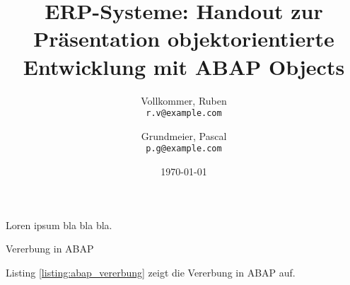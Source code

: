 \documentclass[12pt,a4paper]{scrartcl}
\begin{document}
\title{ERP-Systeme: Handout zur Präsentation objektorientierte Entwicklung mit ABAP Objects}

\author{
  Vollkommer, Ruben\\
  \texttt{r.v@example.com}
  \and
  Grundmeier, Pascal\\
  \texttt{p.g@example.com}
}


\date{\today}
\maketitle

\newpage
\tableofcontents

\renewcommand\listoflistingscaption{Liste des enthaltenen Quellcodes}
\listoflistings

\newpage






Loren ipsum bla bla bla.
\begin{listing}[ht]{}
  \caption{Vererbung in ABAP}
  \label{listing:abap_vererbung}
\end{listing}
\newline 
Listing \ref{listing:abap_vererbung} zeigt die Vererbung in ABAP auf.
\end{document}
